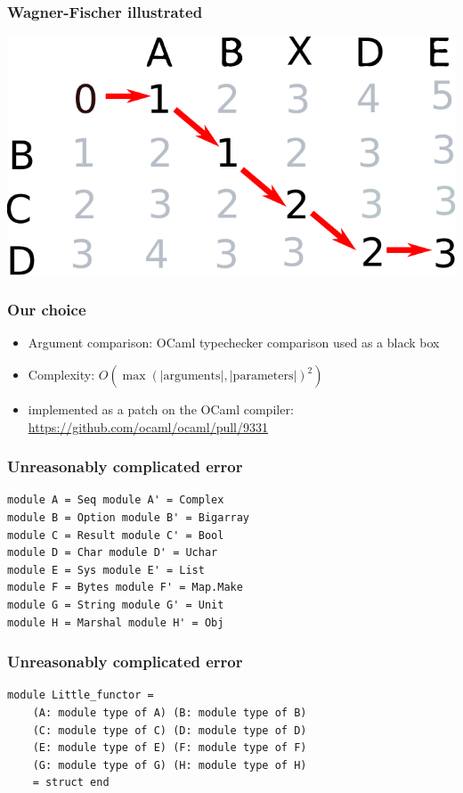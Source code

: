 \documentclass[11pt,aspectratio=169]{beamer}
\begin{document}
\begin{frame}[fragile]\frametitle{Wagner-Fischer illustrated}
   \centering \includegraphics{matrix.pdf}
\end{frame}

\begin{frame}\frametitle{Our choice}
  \begin{itemize}
    \item{Argument comparison: OCaml typechecker comparison used as a black box}
    \item{Complexity: $O(\max(\mathrm{|arguments|,|parameters|})^2)$}
    \item{implemented as a patch on the OCaml compiler:
      \url{https://github.com/ocaml/ocaml/pull/9331} }
  \end{itemize}
\end{frame}


\begin{frame}[fragile]\frametitle{Unreasonably complicated error}
\begin{verbatim}
module A = Seq module A' = Complex
module B = Option module B' = Bigarray
module C = Result module C' = Bool
module D = Char module D' = Uchar
module E = Sys module E' = List
module F = Bytes module F' = Map.Make
module G = String module G' = Unit
module H = Marshal module H' = Obj
\end{verbatim}
\end{frame}
\begin{frame}[fragile]\frametitle{Unreasonably complicated error}
\begin{verbatim}
module Little_functor =
    (A: module type of A) (B: module type of B)
    (C: module type of C) (D: module type of D)
    (E: module type of E) (F: module type of F)
    (G: module type of G) (H: module type of H)
    = struct end
\end{verbatim}
\end{frame}
\end{document}
